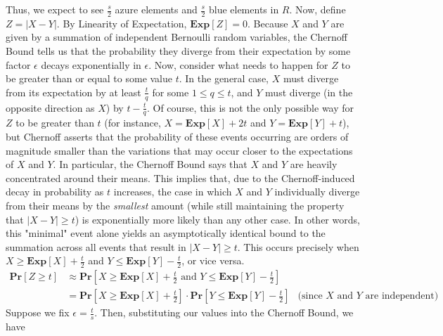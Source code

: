 \documentclass[12pt]{article}
\begin{document}
\begin{solution}
\begin{solution}
Thus, we expect to see $\frac{s}{2}$ azure elements and $\frac{s}{2}$ blue elements in $R$. Now, define $Z = |X - Y|$. By Linearity of Expectation, $\textbf{Exp}[Z] = 0$. Because $X$ and $Y$ are given by a summation of independent Bernoulli random variables, the Chernoff Bound tells us that the probability they diverge from their expectation by some factor $\epsilon$ decays exponentially in $\epsilon$. Now, consider what needs to happen for $Z$ to be greater than or equal to some value $t$. In the general case, $X$ must diverge from its expectation by at least $\frac{t}{q}$ for some $1 \leq q \leq t$, and $Y$ must diverge (in the opposite direction as $X$) by $t - \frac{t}{q}$. Of course, this is not the only possible way for $Z$ to be greater than $t$ (for instance, $X = \textbf{Exp}[X] + 2t$ and $Y = \textbf{Exp}[Y] + t$), but Chernoff asserts that the probability of these events occurring are orders of magnitude smaller than the variations that may occur closer to the expectations of $X$ and $Y$. In particular, the Chernoff Bound says that $X$ and $Y$ are heavily concentrated around their means. This implies that, due to the Chernoff-induced decay in probability as $t$ increases, the case in which $X$ and $Y$ individually diverge from their means by the \textit{smallest} amount (while still maintaining the property that $|X - Y| \geq t$) is exponentially more likely than any other case. In other words, this "minimal" event alone yields an asymptotically identical bound to the summation across all events that result in $|X - Y| \geq t$. This occurs precisely when $X \geq \textbf{Exp}[X] + \frac{t}{2}$ and $Y \leq \textbf{Exp}[Y] - \frac{t}{2}$, or vice versa. 
\begin{align*}
    \textbf{Pr}[Z \geq t] &\approx \textbf{Pr}[X \geq \textbf{Exp}[X] + \frac{t}{2} \text{ and } Y \leq \textbf{Exp}[Y] - \frac{t}{2}] \\
    &= \textbf{Pr}[X \geq \textbf{Exp}[X] + \frac{t}{2}] \cdot \textbf{Pr}[Y \leq \textbf{Exp}[Y] - \frac{t}{2}]  &\text{(since $X$ and $Y$ are independent)}
\end{align*}
Suppose we fix $\epsilon = \frac{t}{s}$. Then, substituting our values into the Chernoff Bound, we have


\end{solution}
\end{solution}
\end{document}

